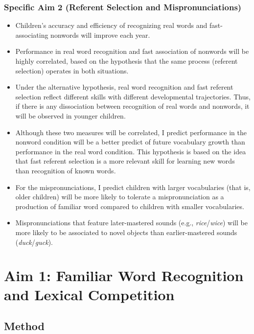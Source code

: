 \documentclass [11pt, proquest] {uwthesis}[2015/03/03]
\begin{document}
\section{Specific Aim 2 (Referent Selection and
Mispronunciations)}\label{specific-aim-2-referent-selection-and-mispronunciations-1}
\begin{itemize}
\item
  Children's accuracy and efficiency of recognizing real words and
  fast-associating nonwords will improve each year.
\item
  Performance in real word recognition and fast association of nonwords
  will be highly correlated, based on the hypothesis that the same
  process (referent selection) operates in both situations.
\item
  Under the alternative hypothesis, real word recognition and fast
  referent selection reflect different skills with different
  developmental trajectories. Thus, if there is any dissociation between
  recognition of real words and nonwords, it will be observed in younger
  children.
\item
  Although these two measures will be correlated, I predict performance
  in the nonword condition will be a better predict of future vocabulary
  growth than performance in the real word condition. This hypothesis is
  based on the idea that fast referent selection is a more relevant
  skill for learning new words than recognition of known words.
\item
  For the mispronunciations, I predict children with larger vocabularies
  (that is, older children) will be more likely to tolerate a
  mispronunciation as a production of familiar word compared to children
  with smaller vocabularies.
\item
  Mispronunciations that feature later-mastered sounds (e.g.,
  \emph{rice}/\emph{wice}) will be more likely to be associated to novel
  objects than earlier-mastered sounds (\emph{duck}/\emph{guck}).
\end{itemize}
\part*{Aim 1: Familiar Word Recognition and Lexical
Competition}\label{part-aim1}

\chapter{Method}\label{aim1-method}
\end{document}
